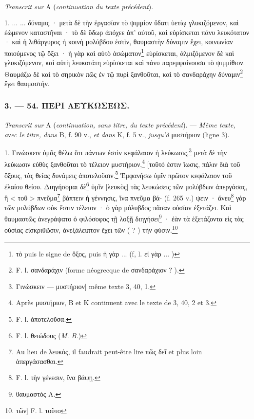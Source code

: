 \documentclass[landscape, a4paper, 11pt, oneside, polutonikogreek, french]{article}
\begin{document}
\paragraph{}
\emph{Transcrit sur} A (\emph{continuation du texte précédent}).

\bigskip

1. ... ... δύναμις · μετὰ δὲ τὴν ἐργασίαν τὸ ψιμμίον ὕδατι ὑετίῳ γλυκιζόμενον, καὶ ἐώμενον καταστῆναι · τὸ δὲ ὕδωρ ἀπόχεε ἀπ' αὐτοῦ, καὶ εὑρίσκεται πάνυ λευκότατον · καὶ ἡ λιθάργυρος ἡ κοινὴ μολύβδου ἐστὶν, θαυμαστὴν δύναμιν ἔχει, κοινωνίαν ποιούμενος τῷ ὄξει · ἡ γὰρ καὶ αὐτὸ ἀσώματον\footnote{τὸ puis le signe de ὄξος, puis ἡ γὰρ ... (f, l. εἰ γὰρ ... )} εὑρίσκεται, ἁλμιζόμενον δὲ καὶ γλυκιζόμενον, καὶ αὐτὴ λευκοτάτη εὑρίσκεται καὶ πάνυ παρεμφαίνουσα τὸ ψιμμίθιον. Θαυμάζω δὲ καὶ τὸ σηρικὸν πῶς ἐν τῷ πυρὶ ξανθοῦται, καὶ τὸ σανδαράχην δύναμιν\footnote{F. l. σανδαράχιν (forme néogrecque de σανδαράχιον ? ).} ἔγει θαυμαστήν.

\bigskip
\centerline{\EightStarTaper}
\centerline{\EightStarTaper\EightStarTaper}
\bigskip

\subsubsection{3. --- 54. ΠΕΡΙ ΛΕΥΚΩΣΕΩΣ.}
\paragraph{}
\emph{Transcrit sur} A (\emph{continuation, sans titre, du texte précédent}). --- \emph{Même texte, aνec le titre, dans} B, f. 90 v., \emph{et dans} K, f. 5 v., \emph{jusqu'à} μυστήριον (ligne 3).

\bigskip

1. Γινώσκειν ὑμᾶς θέλω ὅτι πάντων ἐστὶν κεφάλαιον ἡ λεύκωσις,\footnote{Γινώσκειν --- μυστήριον] même texte 3, 40, 1.} μετὰ δὲ τὴν λεύκωσιν εὐθὺς ξανθοῦται τὸ τέλειον μυστήριον,\footnote{Après μυστήριον, B et K continuent avec le texte de 3, 40, 2 et 3.} [τοῦτό ἐστιν ἴωσις, πάλιν διὰ τοῦ ὄξους, τὰς θείας δυνάμεις ἀποτελοῦσιν.\footnote{F. l. ἀποτελοῦσα.} Ἐμφανήσω ὑμῖν πρῶτον κεφάλαιον τοῦ ἐλαίου θείου. Διηγήσομαι δὲ\footnote{F. l. θειώδους (\emph{M. B.})} ὑμῖν [λευκὸς] τὰς λευκώσεις τῶν μολύβδων ἀπεργάσας, ἢ < τοῦ > πνεῦμα\footnote{Au lieu de λευκὸς, il faudrait peut-être lire πῶς δεῖ et plus loin ἀπεργάσασθαι.} βάπτειν ἡ γέννησις, ἵνα πνεῦμα βά- (f. 265 v.) ψειν · ἄνευ\footnote{F. l. τὴν γένεσιν, ἵνα βάψῃ.} γὰρ τῶν μολύβδων οὐκ ἔστιν τέλειον · ὁ γὰρ μόλυβδος πᾶσαν οὐσίαν ἐξετάζει. Καὶ θαυμαστῶς ἀνεγράψατο ὁ φιλόσοφος τῇ λοξῇ διηγήσει\footnote{θαυμαστὸς A.} · ἐὰν τὰ ἐξετάζοντα εἰς τὰς οὐσίας εἰσκριθῶσιν, ἀνεξάλειπτον ἔχει τῶν ( ? ) τὴν φύσιν.\footnote{τῶν] F. l. τοῦτο}
\end{document}
